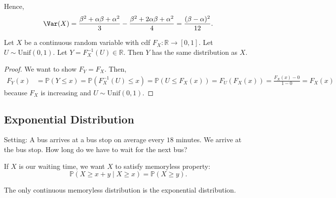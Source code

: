 Hence,
\[
    \Var(X) =\frac{\beta ^2 + \alpha \beta + \alpha ^2}{3} - \frac{\beta ^2 + 2 \alpha \beta + \alpha ^2}{4} = \frac{(\beta - \alpha)^2}{12}.
\]

\begin{theorem}
    Let \(X\) be a continuous random variable with cdf \(F_X: \mathbb{R} \to [0, 1]\). Let \(U \sim \mathrm{Unif}(0, 1) \). Let \(Y = F_X^{-1}(U) \in \mathbb{R}\). Then \(Y\) has the same distribution as \(X\).      
\end{theorem}

\begin{proof}
    We want to show \(F_Y = F_X\). Then,
    \begin{align*}
        F_Y(x) &= \mathbb{P} (Y \le x) = \mathbb{P} (F_X^{-1}(U) \le x) = \mathbb{P} (U \le F_X(x)) = F_U(F_X(x)) = \frac{F_X(x) - 0}{1 - 0} = F_X(x)
    \end{align*} 
    because \(F_X\) is increasing and \(U \sim \mathrm{Unif}(0, 1) \). 
\end{proof}

\subsection{Exponential Distribution}
Setting: A bus arrives at a bus stop on average every \(18\) minutes. We arrive at the bus stop. How long do we have to wait for the next bus?

If \(X\) is our waiting time, we want \(X\) to satisfy memoryless property:
\[
    \mathbb{P} (X \ge x+y \mid X \ge x) = \mathbb{P} (X \ge y).
\]  

\begin{theorem}
    The only continuous memoryless distribution is the exponential distribution.
\end{theorem}

